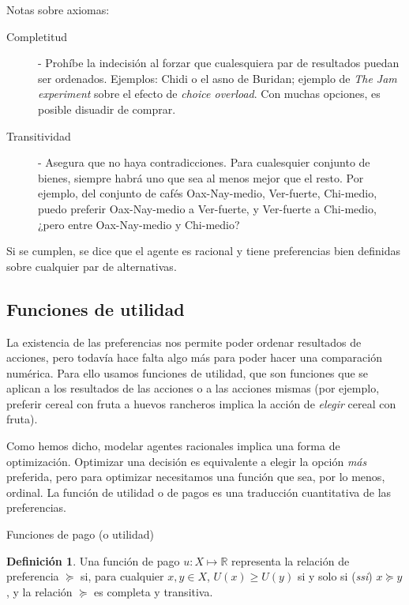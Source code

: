 \documentclass[12pt]{scrartcl}
\theoremstyle{definition}
\newtheorem{defi}{Definición}[section]
\begin{document}
\begin{summarybox}[colback=red!15]{Notas sobre axiomas:}
    \begin{description}
    \item[Completitud]- Prohíbe la indecisión al forzar que cualesquiera par de resultados puedan ser ordenados. Ejemplos: Chidi o el asno de Buridan; ejemplo de \textit{The Jam experiment} sobre el efecto de \textit{choice overload}. Con muchas opciones, es posible disuadir de comprar.
    \item[Transitividad] - Asegura que no haya contradicciones. Para cualesquier conjunto de bienes, siempre habrá uno que sea al menos mejor que el resto. Por ejemplo, del conjunto de cafés Oax-Nay-medio, Ver-fuerte, Chi-medio, puedo preferir Oax-Nay-medio a Ver-fuerte, y Ver-fuerte a Chi-medio, ¿pero entre Oax-Nay-medio y Chi-medio?
    \end{description}
    Si se cumplen, se dice que el agente es racional y tiene preferencias bien definidas sobre cualquier par de alternativas.

\end{summarybox}



\subsection{Funciones de utilidad}

La existencia de las preferencias nos permite poder ordenar resultados de acciones, pero todavía hace falta algo más para poder hacer una comparación numérica. Para ello usamos funciones de utilidad, que son funciones que se aplican a los resultados de las acciones o a las acciones mismas (por ejemplo, preferir cereal con fruta a huevos rancheros implica la acción de \textit{elegir} cereal con fruta).

Como hemos dicho, modelar agentes racionales implica una forma de optimización. Optimizar una decisión es equivalente a elegir la opción \textit{más} preferida, pero para optimizar necesitamos una función que sea, por lo menos, ordinal. La función de utilidad o de pagos es una traducción cuantitativa de las preferencias.

\begin{mybox}{Funciones de pago (o utilidad)}
	\begin{defi}
		Una función de pago $u\colon X \mapsto \mathbb{R}$ representa la relación de preferencia $\succeq$ si, para cualquier $x, y \in X$, $U(x) \geq U(y)$ si y solo si (\textit{ssi}) $x\succeq y$, y la relación $\succeq$ es completa y transitiva.
	\end{defi}
\end{mybox}
\end{document}
